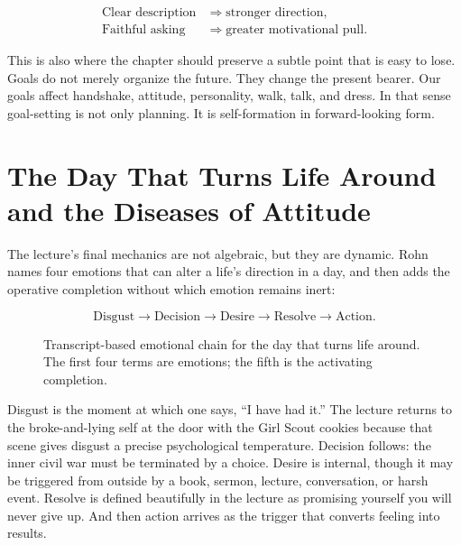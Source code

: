 \begin{align}
\text{Clear description} &\Longrightarrow \text{stronger direction},\\
\text{Faithful asking} &\Longrightarrow \text{greater motivational pull}.
\end{align}

This is also where the chapter should preserve a subtle point that is easy to lose. Goals do not merely organize the future. They change the present bearer. Our goals affect handshake, attitude, personality, walk, talk, and dress. In that sense goal-setting is not only planning. It is self-formation in forward-looking form.

\section{The Day That Turns Life Around and the Diseases of Attitude}

The lecture's final mechanics are not algebraic, but they are dynamic. Rohn names four emotions that can alter a life's direction in a day, and then adds the operative completion without which emotion remains inert:

\begin{equation}
\text{Disgust} \to \text{Decision} \to \text{Desire} \to \text{Resolve} \to \text{Action}.
\end{equation}

\begin{figure}[t]
\centering
{}
\caption{Transcript-based emotional chain for the day that turns life around. The first four terms are emotions; the fifth is the activating completion.}
\end{figure}

Disgust is the moment at which one says, ``I have had it.'' The lecture returns to the broke-and-lying self at the door with the Girl Scout cookies because that scene gives disgust a precise psychological temperature. Decision follows: the inner civil war must be terminated by a choice. Desire is internal, though it may be triggered from outside by a book, sermon, lecture, conversation, or harsh event. Resolve is defined beautifully in the lecture as promising yourself you will never give up. And then action arrives as the trigger that converts feeling into results.


